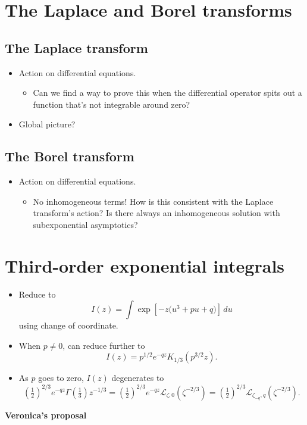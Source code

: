 \documentclass{article}
\newcommand{\laplace}{\mathcal{L}}
\begin{document}
\section{The Laplace and Borel transforms}
\subsection{The Laplace transform}
\begin{itemize}
\item Action on differential equations.
\begin{itemize}
\item Can we find a way to prove this when the differential operator spits out a function that's not integrable around zero?
\end{itemize}
\item Global picture?
\end{itemize}
\subsection{The Borel transform}
\begin{itemize}
\item Action on differential equations.
\begin{itemize}
\item No inhomogeneous terms! How is this consistent with the Laplace transform's action? Is there always an inhomogeneous solution with subexponential asymptotics?
\end{itemize}
\end{itemize}
\section{Third-order exponential integrals}
\begin{itemize}
\item Reduce to
\[ I(z) = \int \exp\left[-z\big(u^3 + pu + q)\right]\,du \]
using change of coordinate.
\item When $p \neq 0$, can reduce further to
\[ I(z) = p^{1/2} e^{-qz} K_{1/3}(p^{3/2} z). \]
\item As $p$ goes to zero, $I(z)$ degenerates to
\[ \left(\tfrac{1}{2}\right)^{2/3} e^{-qz} \Gamma(\tfrac{1}{3}) z^{-1/3} = \left(\tfrac{1}{2}\right)^{2/3} e^{-qz} \laplace_{\zeta,0}(\zeta^{-2/3}) = \left(\tfrac{1}{2}\right)^{2/3} \laplace_{\zeta_{-q},q}(\zeta^{-2/3}). \]
\end{itemize}


\color{orange}
\textbf{Veronica's proposal}
\end{document}
